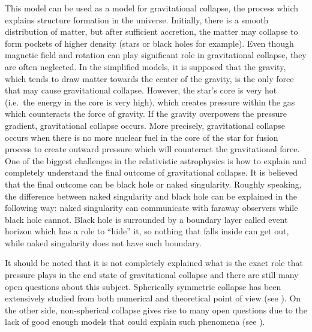 \documentclass[reqno]{article}%
\theoremstyle{plain}
\theoremstyle{definition}
\theoremstyle{remark}
\numberwithin{equation}{section}
\begin{document}
 This model can be used as a model for gravitational collapse, the process which explains structure formation in the universe. Initially, there is a smooth distribution of matter, but after sufficient accretion, the matter may collapse to form pockets of higher density (stars or black holes for example). Even though magnetic field and rotation can play significant role in gravitational collapse, they are often neglected. In the simplified models, it is supposed that the gravity, which tends to draw matter towards the center of the gravity, is the only force that may cause gravitational collapse. However, the star's core is very hot (i.e.\ the energy in the core is very high), which creates pressure within the gas which counteracts the force of gravity. If the gravity overpowers the pressure gradient, gravitational collapse occurs. More precisely, gravitational collapse occurs when there is no more nuclear fuel in the core of the star for fusion process  to  create outward pressure which will counteract the gravitational force.  One of the biggest challenges in the relativistic astrophysics is how to explain and completely understand the final outcome of gravitational collapse. It is believed that the final outcome can be black hole or naked singularity. Roughly speaking, the difference between naked singularity and black hole can be explained in the following way: naked singularity can communicate with faraway observers while black hole cannot. Black hole is surrounded by a boundary layer called event horizon which has a role to ``hide'' it, so nothing that falls inside can get out, while naked singularity does not have such boundary.
 
 
  It should be noted that  it is not completely explained what is the exact role that pressure plays in the end state of gravitational collapse and there are still many open questions about this subject. Spherically symmetric collapse has been extensively studied from both numerical and theoretical point of view (see \cite{astr2, astr1, astr3, Pan}). On the other side, non-spherical collapse gives rise to many open questions due to the lack of good enough models that could explain such phenomena (see \cite{Pan2}).
\end{document}
